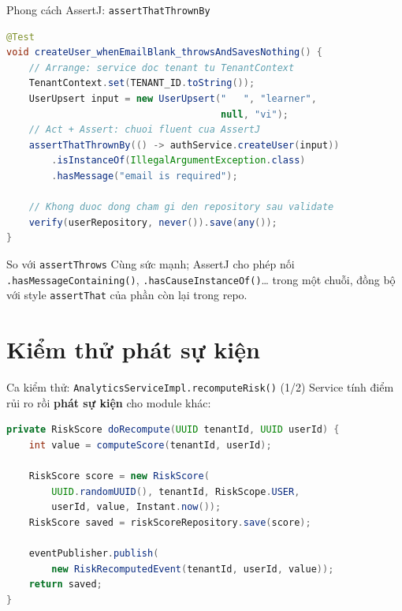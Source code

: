 \documentclass[aspectratio=169,12pt]{beamer}
\begin{document}
\begin{frame}[fragile]{Phong cách AssertJ: \texttt{assertThatThrownBy}}
\begin{lstlisting}[language=java,basicstyle=\ttfamily\scriptsize]
@Test
void createUser_whenEmailBlank_throwsAndSavesNothing() {
    // Arrange: service doc tenant tu TenantContext
    TenantContext.set(TENANT_ID.toString());
    UserUpsert input = new UserUpsert("   ", "learner",
                                      null, "vi");
    // Act + Assert: chuoi fluent cua AssertJ
    assertThatThrownBy(() -> authService.createUser(input))
        .isInstanceOf(IllegalArgumentException.class)
        .hasMessage("email is required");

    // Khong duoc dong cham gi den repository sau validate
    verify(userRepository, never()).save(any());
}
\end{lstlisting}

  \begin{exampleblock}{So với \texttt{assertThrows}}
    Cùng sức mạnh; AssertJ cho phép nối \texttt{.hasMessageContaining()},
    \texttt{.hasCauseInstanceOf()}\ldots{} trong một chuỗi, đồng bộ với
    style \texttt{assertThat} của phần còn lại trong repo.
  \end{exampleblock}
\end{frame}

\section{Kiểm thử phát sự kiện}

\begin{frame}[fragile]{Ca kiểm thử: \texttt{AnalyticsServiceImpl.recomputeRisk()} (1/2)}
  Service tính điểm rủi ro rồi \textbf{phát sự kiện} cho module khác:
\begin{lstlisting}[language=java,basicstyle=\ttfamily\scriptsize]
private RiskScore doRecompute(UUID tenantId, UUID userId) {
    int value = computeScore(tenantId, userId);

    RiskScore score = new RiskScore(
        UUID.randomUUID(), tenantId, RiskScope.USER,
        userId, value, Instant.now());
    RiskScore saved = riskScoreRepository.save(score);

    eventPublisher.publish(
        new RiskRecomputedEvent(tenantId, userId, value));
    return saved;
}
\end{lstlisting}
\end{frame}
\end{document}
